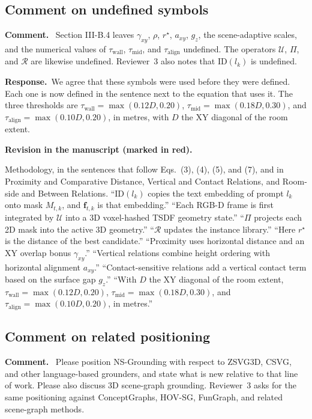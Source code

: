 \documentclass[11pt]{article}
\newcommand{\revcomment}[1]{%
  \par\vspace{0.6em}\noindent\textcolor{revblue}{\textbf{Comment.}}\ %
  \textcolor{revblue}{#1}\par\vspace{0.4em}}
\newcommand{\revresponse}[1]{%
  \par\noindent\textbf{Response.}\ #1\par\vspace{0.3em}}
\newcommand{\revchange}[1]{%
  \par\noindent\textbf{Revision in the manuscript (marked in red).}\par
  \noindent\textcolor{revred}{#1}\par\vspace{0.8em}}
\begin{document}
\subsection*{Comment on undefined symbols}

\revcomment{Section III-B.4 leaves \(\gamma_{xy}\), \(\rho\), \(r^{\star}\), \(a_{xy}\), \(g_z\), the scene-adaptive scales, and the numerical values of \(\tau_{\mathrm{wall}}\), \(\tau_{\mathrm{mid}}\), and \(\tau_{\mathrm{align}}\) undefined. The operators \(\mathcal{U}\), \(\Pi\), and \(\mathcal{R}\) are likewise undefined. Reviewer~3 also notes that \(\mathrm{ID}(l_k)\) is undefined.}

\revresponse{We agree that these symbols were used before they were defined. Each one is now defined in the sentence next to the equation that uses it. The three thresholds are \(\tau_{\mathrm{wall}}=\max(0.12D,0.20)\), \(\tau_{\mathrm{mid}}=\max(0.18D,0.30)\), and \(\tau_{\mathrm{align}}=\max(0.10D,0.20)\), in metres, with \(D\) the XY diagonal of the room extent.}

\revchange{Methodology, in the sentences that follow Eqs.~(3), (4), (5), and (7), and in Proximity and Comparative Distance, Vertical and Contact Relations, and Room-side and Between Relations. ``\(\mathrm{ID}(l_k)\) copies the text embedding of prompt \(l_k\) onto mask \(M_{t,k}\), and \(\mathbf{f}_{t,k}\) is that embedding.'' ``Each RGB-D frame is first integrated by \(\mathcal{U}\) into a 3D voxel-hashed TSDF geometry state.'' ``\(\Pi\) projects each 2D mask into the active 3D geometry.'' ``\(\mathcal{R}\) updates the instance library.'' ``Here \(r^{\star}\) is the distance of the best candidate.'' ``Proximity uses horizontal distance and an XY overlap bonus \(\gamma_{xy}\).'' ``Vertical relations combine height ordering with horizontal alignment \(a_{xy}\).'' ``Contact-sensitive relations add a vertical contact term based on the surface gap \(g_z\).'' ``With \(D\) the XY diagonal of the room extent, \(\tau_{\mathrm{wall}}=\max(0.12D,0.20)\), \(\tau_{\mathrm{mid}}=\max(0.18D,0.30)\), and \(\tau_{\mathrm{align}}=\max(0.10D,0.20)\), in metres.''}

\subsection*{Comment on related positioning}

\revcomment{Please position NS-Grounding with respect to ZSVG3D, CSVG, and other language-based grounders, and state what is new relative to that line of work. Please also discuss 3D scene-graph grounding. Reviewer~3 asks for the same positioning against ConceptGraphs, HOV-SG, FunGraph, and related scene-graph methods.}
\end{document}
